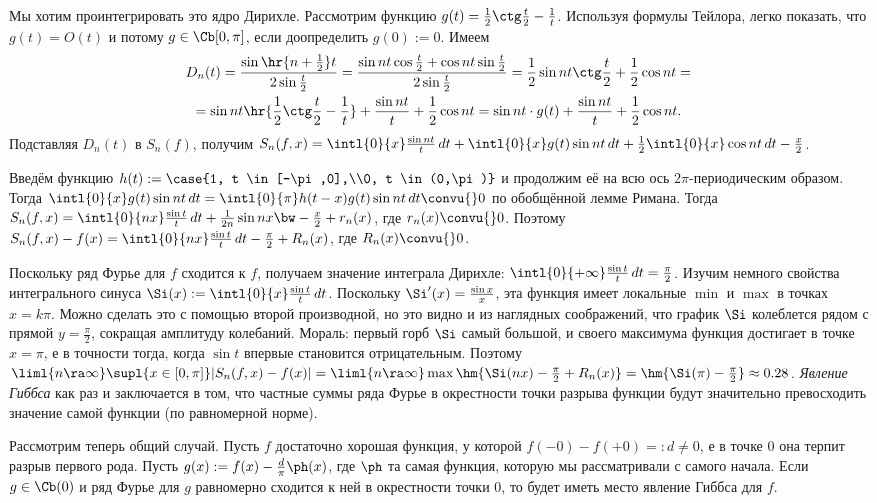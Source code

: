 \documentclass[a4paper]{article}
\newcommand{\intlop}{\intl{0}{\pi}}
\newcommand{\intlox}{\intl{0}{x}}
\begin{document}
Мы хотим проинтегрировать это ядро Дирихле. Рассмотрим функцию $g(t) = \frac{1}{2}\ctg \frac{t}{2} - \frac{1}{t}$. Используя формулы Тейлора,
легко показать, что $g(t) = O(t)$ и потому $g \in\Cb[0,\pi]$, если доопределить $g(0) := 0$. Имеем
\begin{multline*}
D_n(t)=\frac{\sin\hr{n+\frac{1}{2}}t}{2\sin\frac{t}{2}} =
\frac{\sin nt \cos \frac{t}{2} + \cos nt \sin \frac{t}{2}}{2\sin\frac{t}{2}}=
\frac{1}{2}\sin nt \ctg \frac{t}{2} + \frac{1}{2}\cos nt =\\=
\sin nt \hr{\frac{1}{2}\ctg \frac{t}{2}-\frac{1}{t}} +\frac{\sin nt}{t} + \frac{1}{2}\cos nt=
\sin nt \cdot g(t) + \frac{\sin nt}{t} + \frac{1}{2}\cos nt.
\end{multline*}
Подставляя $D_n(t)$ в $S_n(f)$, получим $S_n(f,x) = \intlox \frac{\sin nt}{t}\,d t + \intlox
g(t)\sin nt \,d t + \frac{1}{2}\intlox \cos nt \,d t -\frac{x}{2}$.

Введём функцию $h(t) := \case{1, t \in [-\pi,0],\\0, t \in (0,\pi)}$ и продолжим её на всю ось
$2\pi$-периодическим образом. Тогда $\intlox g(t)\sin nt \,d t = \intlop h(t-x)g(t)\sin nt \,d t
\convu{} 0$ по обобщённой лемме Римана. Тогда $S_n(f,x) = \intl{0}{nx}\frac{\sin t}{t}\,d t +
\frac{1}{2n}\sin nx \bw- \frac x2 + r_n(x)$, где $r_n(x)\convu{}0$. Поэтому $S_n(f,x) - f(x) =
\intl{0}{nx}\frac{\sin t}{t}\,d t - \frac{\pi}{2} + R_n(x)$, где $R_n(x)\convu{}0$.

Поскольку ряд Фурье для $f$ сходится к $f$, получаем значение интеграла Дирихле:
$\intl{0}{+\infty}\frac{\sin t}{t}\,d t =\frac{\pi}{2}$. Изучим немного свойства интегрального
синуса $\Si(x) := \intlox\frac{\sin t}{t}\,d t$. Поскольку $\Si'(x) = \frac{\sin x}{x}$, эта
функция имеет локальные $\min$ и $\max$ в точках $x = k\pi$. Можно сделать это с помощью второй
производной, но это видно и из наглядных соображений, что график $\Si$ колеблется рядом с прямой $y
= \frac{\pi}{2}$, сокращая амплитуду колебаний. Мораль: первый горб $\Si$ самый большой, и
своего максимума функция достигает в точке $x=\pi$, е в точности тогда, когда $\sin t$ впервые
становится отрицательным. Поэтому $\liml{n\ra\infty}\supl{x\in[0,\pi]}|S_n(f,x) - f(x)| =
\liml{n\ra\infty} \max \hm{\Si(nx) - \frac{\pi}{2} + R_n(x)} = \hm{\Si(\pi)-\frac{\pi}{2}} \approx
0.28$. \emph{Явление Гиббса} как раз и заключается в том, что частные суммы ряда Фурье в окрестности точки
разрыва функции будут значительно превосходить значение самой функции (по равномерной норме).

Рассмотрим теперь общий случай. Пусть $f$ достаточно хорошая функция, у которой $f(-0) - f(+0) =: d \neq 0$, е в точке $0$ она
терпит разрыв первого рода. Пусть $g(x) := f(x) - \frac{d}{\pi}\ph(x)$, где $\ph$ та самая функция, которую мы рассматривали с самого начала.
Если $g \in\Cb(0)$ и ряд Фурье для $g$ равномерно сходится к ней в окрестности точки 0, то будет иметь место явление Гиббса для $f$.
\end{document}
